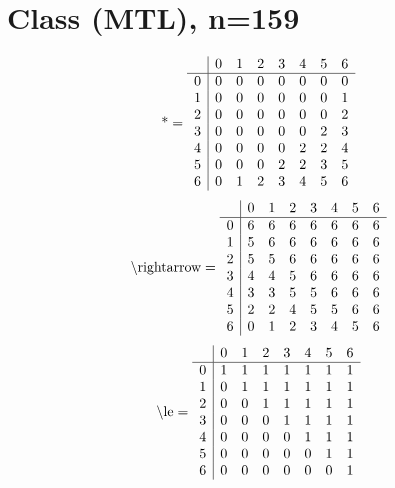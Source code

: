 \documentclass[11pt]{article}
\begin{document}
\section{Class (MTL), n=159}
\[\text{*} = 
\begin{array}{r | r r r r r r r}
 & 0 & 1 & 2 & 3 & 4 & 5 & 6 \\ \hline
0 & 0 & 0 & 0 & 0 & 0 & 0 & 0 \\
1 & 0 & 0 & 0 & 0 & 0 & 0 & 1 \\
2 & 0 & 0 & 0 & 0 & 0 & 0 & 2 \\
3 & 0 & 0 & 0 & 0 & 0 & 2 & 3 \\
4 & 0 & 0 & 0 & 0 & 2 & 2 & 4 \\
5 & 0 & 0 & 0 & 2 & 2 & 3 & 5 \\
6 & 0 & 1 & 2 & 3 & 4 & 5 & 6 \\
\end{array}
\]
\[\text{\textbackslash rightarrow} = 
\begin{array}{r | r r r r r r r}
 & 0 & 1 & 2 & 3 & 4 & 5 & 6 \\ \hline
0 & 6 & 6 & 6 & 6 & 6 & 6 & 6 \\
1 & 5 & 6 & 6 & 6 & 6 & 6 & 6 \\
2 & 5 & 5 & 6 & 6 & 6 & 6 & 6 \\
3 & 4 & 4 & 5 & 6 & 6 & 6 & 6 \\
4 & 3 & 3 & 5 & 5 & 6 & 6 & 6 \\
5 & 2 & 2 & 4 & 5 & 5 & 6 & 6 \\
6 & 0 & 1 & 2 & 3 & 4 & 5 & 6 \\
\end{array}
\]
\[\text{\textbackslash le} = 
\begin{array}{r | r r r r r r r}
 & 0 & 1 & 2 & 3 & 4 & 5 & 6 \\ \hline
0 & 1 & 1 & 1 & 1 & 1 & 1 & 1 \\
1 & 0 & 1 & 1 & 1 & 1 & 1 & 1 \\
2 & 0 & 0 & 1 & 1 & 1 & 1 & 1 \\
3 & 0 & 0 & 0 & 1 & 1 & 1 & 1 \\
4 & 0 & 0 & 0 & 0 & 1 & 1 & 1 \\
5 & 0 & 0 & 0 & 0 & 0 & 1 & 1 \\
6 & 0 & 0 & 0 & 0 & 0 & 0 & 1 \\
\end{array}
\]
\end{document}
